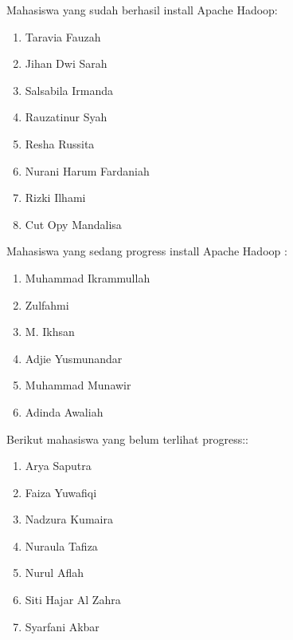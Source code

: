 \documentclass[a4paper]{tufte-handout}
\begin{document}

\noindent
Mahasiswa yang sudah berhasil install Apache Hadoop:
\begin{multicols}{2}
\begin{enumerate}
\item Taravia Fauzah
\item Jihan Dwi Sarah
\item Salsabila Irmanda
\item Rauzatinur Syah
\item Resha Russita
\item Nurani Harum Fardaniah
\item Rizki Ilhami
\item Cut Opy Mandalisa
\end{enumerate}
\end{multicols}

\noindent
Mahasiswa yang sedang progress install Apache Hadoop :
\begin{multicols}{2}
\begin{enumerate}
\item Muhammad Ikrammullah
\item Zulfahmi
\item M. Ikhsan
\item Adjie Yusmunandar
\item Muhammad Munawir
\item Adinda Awaliah
\end{enumerate}
\end{multicols}

\noindent
Berikut mahasiswa yang belum terlihat progress::
\begin{multicols}{2}
\begin{enumerate}
\item Arya Saputra
\item Faiza Yuwafiqi
\item Nadzura Kumaira
\item Nuraula Tafiza
\item Nurul Aflah
\item Siti Hajar Al Zahra
\item Syarfani Akbar
\end{enumerate}
\end{multicols}

\hrulefill
\end{document}
